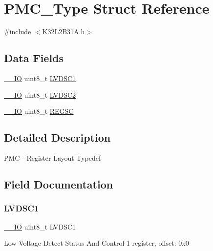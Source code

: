 \hypertarget{struct_p_m_c___type}{}\section{P\+M\+C\+\_\+\+Type Struct Reference}
\label{struct_p_m_c___type}


{\ttfamily \#include $<$K32\+L2\+B31\+A.\+h$>$}

\subsection*{Data Fields}
\begin{DoxyCompactItemize}
\item 
\mbox{\hyperlink{core__cm0plus_8h_aec43007d9998a0a0e01faede4133d6be}{\+\_\+\+\_\+\+IO}} uint8\+\_\+t \mbox{\hyperlink{struct_p_m_c___type_a183606de7c919c44520d5625860eaebd}{L\+V\+D\+S\+C1}}
\item 
\mbox{\hyperlink{core__cm0plus_8h_aec43007d9998a0a0e01faede4133d6be}{\+\_\+\+\_\+\+IO}} uint8\+\_\+t \mbox{\hyperlink{struct_p_m_c___type_a22e5df8ec02f6f9fb1aae7aab10f7ac6}{L\+V\+D\+S\+C2}}
\item 
\mbox{\hyperlink{core__cm0plus_8h_aec43007d9998a0a0e01faede4133d6be}{\+\_\+\+\_\+\+IO}} uint8\+\_\+t \mbox{\hyperlink{struct_p_m_c___type_ac2fc2acedfe2248d41dfbaaccd2a582e}{R\+E\+G\+SC}}
\end{DoxyCompactItemize}


\subsection{Detailed Description}
P\+MC -\/ Register Layout Typedef 

\subsection{Field Documentation}
\mbox{\label{struct_p_m_c___type_a183606de7c919c44520d5625860eaebd}} 
\subsubsection{\texorpdfstring{LVDSC1}{LVDSC1}}
{\footnotesize\ttfamily \mbox{\hyperlink{core__cm0plus_8h_aec43007d9998a0a0e01faede4133d6be}{\+\_\+\+\_\+\+IO}} uint8\+\_\+t L\+V\+D\+S\+C1}

Low Voltage Detect Status And Control 1 register, offset\+: 0x0 \mbox{\label{struct_p_m_c___type_a22e5df8ec02f6f9fb1aae7aab10f7ac6}} 
